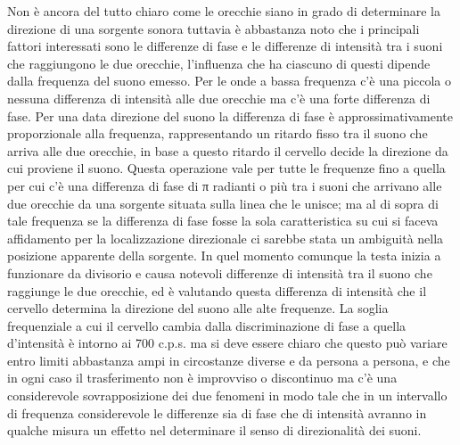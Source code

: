 \documentclass[11pt]{article}
\begin{document}
\begin{multicols*}{2}
Non è ancora del tutto chiaro come le orecchie siano in grado di determinare la direzione di una sorgente sonora tuttavia è abbastanza noto che i principali fattori interessati sono le differenze di fase e le differenze di intensità tra i suoni che raggiungono le due orecchie, l’influenza che ha ciascuno di questi dipende dalla frequenza del suono emesso. Per le onde a bassa frequenza c’è una piccola o nessuna differenza di intensità alle due orecchie ma c’è una forte differenza di fase. Per una data direzione del suono la differenza di fase è approssimativamente proporzionale alla frequenza, rappresentando un ritardo fisso tra il suono che arriva alle due orecchie, in base a questo ritardo il cervello decide la direzione da cui proviene il suono. Questa operazione vale per tutte le frequenze fino a quella per cui c’è una differenza di fase di π radianti o più tra i suoni che arrivano alle due orecchie da una sorgente situata sulla linea che le unisce; ma al di sopra di tale frequenza se la differenza di fase fosse la sola caratteristica su cui si faceva affidamento per la localizzazione direzionale ci sarebbe stata un ambiguità nella posizione apparente della sorgente. In quel momento comunque la testa inizia a funzionare da divisorio e causa notevoli differenze di intensità tra il suono che raggiunge le due orecchie, ed è valutando questa differenza di intensità che il cervello determina la direzione del suono alle alte frequenze. La soglia frequenziale a cui il cervello cambia dalla discriminazione di fase a quella d’intensità è intorno ai 700 c.p.s. ma si deve essere chiaro che questo può variare entro limiti abbastanza ampi in circostanze diverse e da persona a persona, e che in ogni caso il trasferimento non è improvviso o discontinuo ma c’è una considerevole sovrapposizione dei due fenomeni in modo tale che in un intervallo di frequenza considerevole le differenze sia di fase che di intensità avranno in qualche misura un effetto nel determinare il senso di direzionalità dei suoni.


\end{multicols*}
\end{document}

